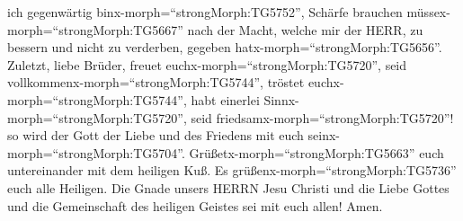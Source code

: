 ich gegenwärtig binx-morph=``strongMorph:TG5752'', Schärfe brauchen
müssex-morph=``strongMorph:TG5667'' nach der Macht, welche mir der HERR,
zu bessern und nicht zu verderben, gegeben
hatx-morph=``strongMorph:TG5656''.  Zuletzt, liebe Brüder,
freuet euchx-morph=``strongMorph:TG5720'', seid
vollkommenx-morph=``strongMorph:TG5744'', tröstet
euchx-morph=``strongMorph:TG5744'', habt einerlei
Sinnx-morph=``strongMorph:TG5720'', seid
friedsamx-morph=``strongMorph:TG5720''! so wird der Gott der Liebe und
des Friedens mit euch seinx-morph=``strongMorph:TG5704''. 
Grüßetx-morph=``strongMorph:TG5663'' euch untereinander mit dem heiligen
Kuß.  Es grüßenx-morph=``strongMorph:TG5736'' euch alle
Heiligen.  Die Gnade unsers HERRN Jesu Christi und die
Liebe Gottes und die Gemeinschaft des heiligen Geistes sei mit euch
allen! Amen.
